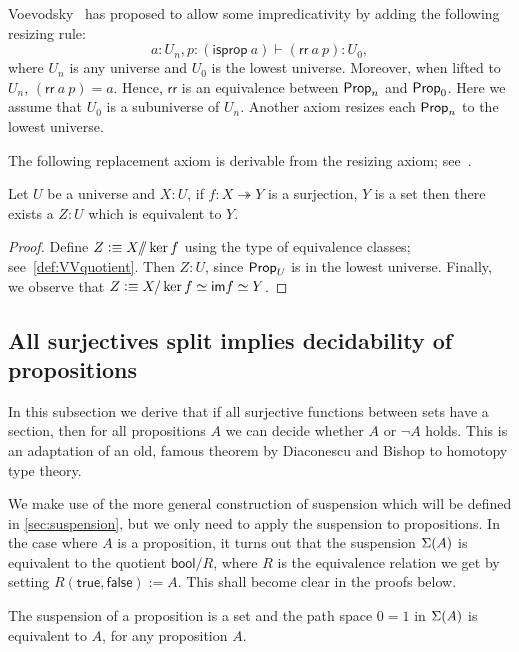 Voevodsky~\cite{Universe-poly} has proposed to allow some impredicativity by adding the following resizing rule:
\[a:U_n, p:(\mathsf{isprop}\ a)\vdash (\mathsf{rr}\ a\ p): U_0,\]
where $U_n$ is any universe and $U_0$ is the lowest universe.
Moreover, when lifted to $U_n$, $(\mathsf{rr}\ a\ p)= a$.
Hence, $\mathsf{rr}$ is an equivalence between $\mathsf{Prop}_n$ and $\mathsf{Prop}_0$. 
Here we assume that $U_0$ is a subuniverse of $U_n$. 
Another axiom resizes each $\mathsf{Prop}_n$ to the lowest universe.

The following replacement axiom is derivable from the resizing axiom; see~\cite{Universe-poly}.
\begin{lem}
Let $U$ be a universe and $X:U$, if $f:X\twoheadrightarrow Y$ is a surjection, $Y$ is a set then there exists a $Z:U$ which is
equivalent to $Y$.
\end{lem}
\begin{proof}
Define $Z\vcentcolon\equiv X/\!\!/\ker f$ using the type of equivalence classes; see~\ref{def:VVquotient}. 
Then $Z:U$, since $\mathsf{Prop}_U$ is in the lowest universe. Finally, we observe that $Z\vcentcolon\equiv X/\ker f\simeq\mathsf{im} f\simeq Y$.
\end{proof}

\subsection{All surjectives split implies decidability of propositions}\label{sec:surj_split}
In this subsection we derive that if all surjective functions between sets have
a section, then for all propositions $A$ we can decide whether $A$ or $\neg A$
holds. This is an adaptation of an old, famous theorem by
Diaconescu and Bishop to homotopy type theory. %

We make use of the more general construction of suspension which will be defined in \autoref{sec:suspension}, but we only need
to apply the suspension to propositions. In the case where $A$ is a proposition,
it turns out that the
suspension $\Sigma(A)$ is equivalent to the quotient $\mathsf{bool}/R$,
where $R$ is the equivalence relation we get by setting
$R(\mathsf{true},\mathsf{false}):= A$. This shall become clear in the proofs
below.

\begin{lem}\label{prop:trunc_of_prop_is_set}
The suspension of a proposition is a set and the path space 
$0=1$ in $\Sigma(A)$ is equivalent to $A$, for any proposition $A$. 
\end{lem}

